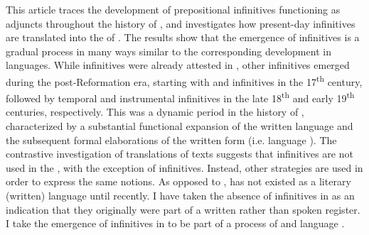 \documentclass[output=paper]{langscibook}
\begin{document}
This article traces the development of prepositional infinitives functioning as  adjuncts throughout the history of , and investigates how present-day   infinitives are translated into the  of . The results show that the emergence of  infinitives is a gradual process in many ways similar to the corresponding development in  languages. While  infinitives were already attested in , other  infinitives emerged during the post-Reformation era, starting with  and  infinitives in the 17\textsuperscript{th} century, followed by temporal and instrumental infinitives in the late 18\textsuperscript{th} and early 19\textsuperscript{th} centuries, respectively. This was a dynamic period in the history of , characterized by a substantial functional expansion of the written language and the subsequent formal elaborations of the written form (i.e. language ). The contrastive investigation of  translations of  texts suggests that  infinitives are not used in the , with the exception of  infinitives. Instead, other strategies are used in order to express the same  notions. As opposed to ,  has not existed as a literary (written) language until recently. I have taken the absence of  infinitives in  as an indication that they originally were part of a written rather than spoken register. I take the emergence of  infinitives in  to be part of a process of  and language . 
\end{document}
